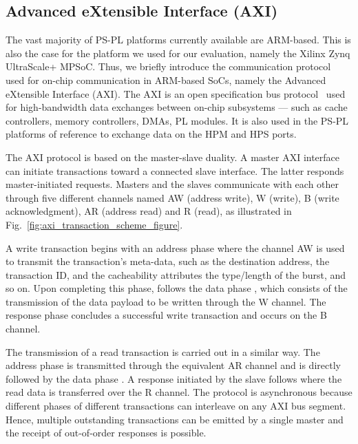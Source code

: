 \subsection{Advanced eXtensible Interface (AXI)}
\label{subsec:axi_transaction_scheme}
The vast majority of PS-PL platforms currently available are
ARM-based. This is also the case for the platform we used for our
evaluation, namely the Xilinx Zynq UltraScale+ MPSoC. Thus, we briefly
introduce the communication protocol used for on-chip communication in
ARM-based SoCs, namely the Advanced eXtensible Interface (AXI). The
AXI is an open specification bus protocol~\cite{ARM-AXI} used for
high-bandwidth data exchanges between on-chip subsystems --- such as
cache controllers, memory controllers, DMAs, PL modules.
It is also used in the PS-PL platforms of reference to exchange data on the
HPM and HPS ports.

The AXI protocol is based on the master-slave duality. A master AXI
interface can initiate transactions toward a connected slave
interface.  The latter responds master-initiated
requests.  Masters and the slaves communicate with each other through
five different channels named AW (address write), W (write), B (write
acknowledgment), AR (address read) and R (read), as illustrated in
Fig.~\ref{fig:axi_transaction_scheme_figure}.

A write transaction begins with an address phase  where the
channel AW is used to transmit the transaction's meta-data, such
as the destination address, the transaction ID, and the cacheability
attributes the type/length of the burst, and so on.  Upon completing this phase, follows the data phase , which
consists of the transmission of the data payload to be written through
the W channel.  The response phase  concludes a successful write transaction and occurs on the B channel.

The transmission of a read transaction is carried out in a similar
way.  The address phase  is transmitted through the
equivalent AR channel and is directly followed by the data phase
.  A response initiated by the slave follows where the
read data is transferred over the R channel. The protocol is
asynchronous because different phases of different transactions can
interleave on any AXI bus segment. Hence, multiple outstanding
transactions can be emitted by a single master and the receipt of
out-of-order responses is possible.

